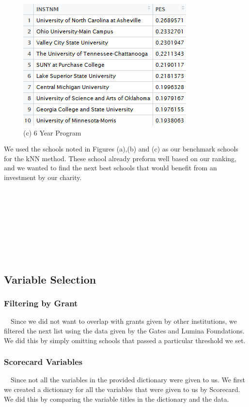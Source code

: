 \documentclass[12pt]{scrartcl}
\begin{document}
		\begin{figure}
		\centering
		\includegraphics*[width=0.90\linewidth]{6yr-col.png}\caption*{(c) 6 Year Program}
		\end{figure} 	
		We used the schools noted in Figures (a),(b) and (c) as our benchmark schools for the kNN method. These school already preform well based on our ranking, and we wanted to find the next best schools that would benefit from an investment by our charity.
		\\
		\\
		\\
		\\
		\\
		\\
		\\
		\\
		\\
	\subsection{Variable Selection}
		\subsubsection{Filtering by Grant}
			\ \ Since we did not want to overlap with grants given by other institutions, we filtered the next list using the data given by the Gates \cite{Bill} and Lumina \cite{Grant} Foundations. We did this by simply omitting schools that passed a particular threshold we set.
		
		\subsubsection{Scorecard Variables}
			\ \ Since not all the variables in the provided dictionary were given to us. We first we created a dictionary for all the variables that were given to us by Scorecard. We did this by comparing the variable titles in the dictionary and the data. \\
			
\end{document}

